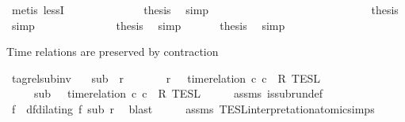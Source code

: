 \begin{isabellebody}
\ {\isacharparenleft}metis\ lessI{\isacharparenright}\isanewline
\ \ \ \ \ \ \ \ \ \ \ \ \isamarkupfalse%
\ {\isacharquery}thesis\ \isamarkupfalse%
\ simp\isanewline
\ \ \ \ \ \ \ \ \ \ \isamarkupfalse%
\isanewline
\ \ \ \ \ \ \ \ \isamarkupfalse%
\isanewline
\ \ \ \ \ \ \isacommand{{\isacharbraceright}}\isamarkupfalse%
\ \isamarkupfalse%
\ {\isacharquery}thesis\ \isamarkupfalse%
\ simp\isanewline
\ \ \ \ \ \ \isamarkupfalse%
\isanewline
\ \ \ \ \isacommand{{\isacharbraceright}}\isamarkupfalse%
\ \isamarkupfalse%
\ {\isacharquery}thesis\ \isamarkupfalse%
\ simp\isanewline
\ \ \isamarkupfalse%
\isanewline
\ \ \isamarkupfalse%
\ {\isacharquery}thesis\ \isamarkupfalse%
\ simp\isanewline
{}\isamarkupfalse%
%
\endisatagproof
{\isafoldproof}%
%
\isadelimproof
%
\endisadelimproof
%
\begin{isamarkuptext}%
Time relations are preserved by contraction%
\end{isamarkuptext}\isamarkuptrue%
\isamarkupfalse%
\ tagrel{\isacharunderscore}sub{\isacharunderscore}inv{\isacharcolon}\isanewline
\ \ \ {\isacartoucheopen}sub\ {\isasymlless}\ r{\isacartoucheclose}\isanewline
\ \ \ \ \ \ \ {\isacartoucheopen}r\ {\isasymin}\ {\isasymlbrakk}\ time{\isacharminus}relation\ {\isasymlfloor}c\ c\ {\isasymin}\ R\ {\isasymrbrakk}\isactrlsub T\isactrlsub E\isactrlsub S\isactrlsub L{\isacartoucheclose}\isanewline
\ \ \ \ \ {\isacartoucheopen}sub\ {\isasymin}\ {\isasymlbrakk}\ time{\isacharminus}relation\ {\isasymlfloor}c\ c\ {\isasymin}\ R\ {\isasymrbrakk}\isactrlsub T\isactrlsub E\isactrlsub S\isactrlsub L{\isacartoucheclose}\isanewline
%
\isadelimproof
%
\endisadelimproof
%
\isatagproof
{}\isamarkupfalse%
\ {\isacharminus}\isanewline
\ \ \isamarkupfalse%
\ assms{\isacharparenleft}{}{\isacharparenright}\ is{\isacharunderscore}subrun{\isacharunderscore}def\ \isamarkupfalse%
\ f\ \ df{\isacharcolon}{\isacartoucheopen}dilating\ f\ sub\ r{\isacartoucheclose}\ \isamarkupfalse%
\ blast\isanewline
\ \ \isamarkupfalse%
\ \isamarkupfalse%
\ assms{\isacharparenleft}{}{\isacharparenright}\ TESL{\isacharunderscore}interpretation{\isacharunderscore}atomic{\isachardot}simps{\isacharparenleft}{}{\isacharparenright}\ \isamarkupfalse%

\end{isabellebody}
